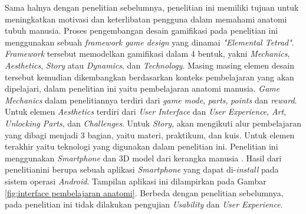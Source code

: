 Sama halnya dengan penelitian sebelumnya, penelitian ini memiliki tujuan untuk meningkatkan motivasi dan keterlibatan pengguna dalam memahami anatomi tubuh manusia.
Proses pengembangan desain gamifikasi pada penelitian ini menggunakan sebuah \textit{framework game design} yang dinamai \textit{"Elemental Tetrad"}\cite{AnatomyGamification}.
\textit{Framework} tersebut memodelkan gamifikasi dalam 4 bentuk, yakni \textit{Mechanics}, \textit{Aesthetics}, \textit{Story} atau \textit{Dynamics}, dan \textit{Technology}\cite{marisa2020gamifikasi}.
Masing masing elemen desain tersebut kemudian dikembangkan berdasarkan konteks pembelajaran yang akan dipelajari, dalam penelitian ini yaitu pembelajaran anatomi manusia.
\textit{Game Mechanics} dalam penelitiannya terdiri dari \textit{game mode}, \textit{parts}, \textit{points} dan \textit{reward}. 
Untuk elemen \textit{Aesthetics} terdiri dari \textit{ User Interface} dan \textit{User Experience}, \textit{Art}, \textit{Unlocking Parts}, dan \textit{Challenges}.
Untuk \textit{Story}, akan mengikuti alur pembelajaran yang dibagi menjadi 3 bagian, yaitu materi, praktikum, dan kuis\cite{AnatomyGamification}.
Untuk elemen terakhir yaitu teknologi yang digunakan dalam penelitian ini. Penelitian ini menggunakan \textit{Smartphone} dan 3D model dari kerangka manusia \cite{AnatomyGamification}.
Hasil dari penelitianini berupa sebuah aplikasi \textit{Smartphone} yang dapat di-\textit{install} pada sistem operasi \textit{Android}.
Tampilan aplikasi ini dilampirkan pada Gambar \ref*{fig:interface pembelajaran anatomi}.
Berbeda dengan penelitian sebelumnya, pada penelitian ini tidak dilakukan pengujian \textit{Usability} dan \textit{User Experience}.
